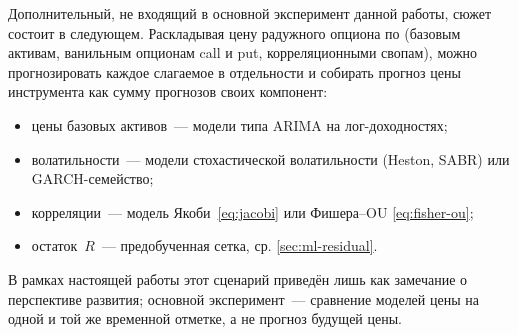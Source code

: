Дополнительный, не входящий в основной эксперимент данной работы,
сюжет состоит в следующем. Раскладывая цену радужного опциона
по (базовым активам, ванильным опционам call и put, корреляционными свопам), можно прогнозировать каждое слагаемое в
отдельности и собирать прогноз цены инструмента как сумму прогнозов
своих компонент:

\begin{itemize}
  \item цены базовых активов~--- модели типа ARIMA на лог-доходностях;
  \item волатильности~--- модели стохастической волатильности
        (Heston, SABR) или GARCH-семейство;
  \item корреляции~--- модель Якоби~\eqref{eq:jacobi} или Фишера--OU
        \eqref{eq:fisher-ou};
  \item остаток~$R$~--- предобученная сетка, ср. \cref{sec:ml-residual}.
\end{itemize}

В рамках настоящей работы этот сценарий приведён лишь как замечание о
перспективе развития; основной эксперимент~--- сравнение моделей цены
на одной и той же временной отметке, а не прогноз будущей цены.
